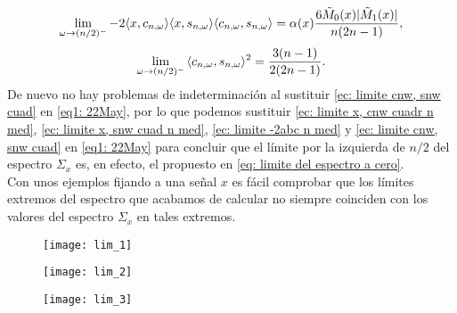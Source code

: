 \begin{equation}
\label{ec: limite -2abc n med}
\lim\limits_{\omega \rightarrow (n/2)^{-}}{
-2 \langle x, c_{n, \omega} \rangle
\langle x, s_{n, \omega} \rangle
\langle c_{n, \omega}, s_{n, \omega} \rangle
= 
\alpha(x) \frac{6\tilde{M}_{0}(x)| \tilde{M}_{1}(x)|}{n(2n-1)},
}
\end{equation}
\begin{equation}
\label{ec: limite cnw, snw cuad}
\lim\limits_{\omega \rightarrow (n/2)^{-}}{\langle
c_{n, \omega}, s_{n, \omega}
\rangle^{2} }
= \frac{3(n-1)}{2(2n-1)}.
\end{equation}
De nuevo no hay problemas de indeterminación al 
sustituir \eqref{ec: limite cnw, snw cuad} en 
\eqref{eq1: 22May}, por lo que podemos 
sustituir 
\eqref{ec: limite x, cnw cuadr n med}, 
\eqref{ec: limite x, snw cuad n med}, 
\eqref{ec: limite -2abc n med} y 
\eqref{ec: limite cnw, snw cuad} en 
\eqref{eq1: 22May} para concluir que el límite por la izquierda
de $n/2$ del espectro $\Sigma_{x}$ es, en efecto,
el propuesto
en 
\eqref{eq: limite del espectro a cero}. \\


Con unos ejemplos 
fijando a una señal $x$
es fácil comprobar que los límites extremos del espectro
que acabamos de calcular no siempre coinciden con los valores
del espectro $\Sigma_{x}$ en tales extremos.
\QEDB
\vspace{0.2cm}


\begin{figure}[H]
	\centering
	\texttt{[image: lim\_1]} 
\end{figure}	

\begin{figure}[H]
	\centering
	\texttt{[image: lim\_2]} 
\end{figure}

\begin{figure}[H]
	\centering
	\texttt{[image: lim\_3]} 
\end{figure}

